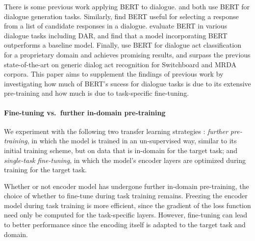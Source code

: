 \documentclass[11pt,a4paper]{article}
\begin{document}
There is some previous work applying BERT to dialogue.
\citet{baoPLATOPretrainedDialogue2019} and \citet{chenSemanticallyConditionedDialog2019a} both use BERT for dialogue generation tasks.
Similarly, \citet{vigComparisonTransferLearningApproaches2019} find BERT useful for selecting a response from a list of candidate responses in a dialogue.
\citet{mehriPretrainingMethodsDialog2019} evaluate BERT in various dialogue tasks including DAR, and find that a model incorporating BERT outperforms a baseline model.
Finally, \citet{chakravarty2019dialog} use BERT for dialogue act classification for a proprietary domain and achieves promising results, and \citet{ribeiro2019deep} surpass the previous state-of-the-art on generic dialog act recognition for Switchboard and MRDA corpora. 
This paper aims to supplement the findings of previous work by investigating how much of 
BERT's sucess for dialogue tasks is due to its extensive pre-training and how much is due to 
task-specific fine-tuning.




\paragraph{Fine-tuning vs.~further in-domain pre-training}
We experiment with the following two transfer learning strategies \citep{sunHowFineTuneBERT2019}:
\emph{further pre-training}, in which the model is trained in an un-supervised way, similar to its initial training scheme, but on data that is in-domain for the target task; and
\emph{single-task fine-tuning}, in which the model's encoder layers are optimized during training for the target task.

Whether or not encoder model has undergone further in-domain pre-training, 
the choice of whether to fine-tune during task training remains.
Freezing the encoder model during task training is more efficient, 
since the gradient of the loss function need only be computed for the task-specific layers.
However, fine-tuning can lead to better performance since the encoding itself is adapted to the target task and domain.
\end{document}
